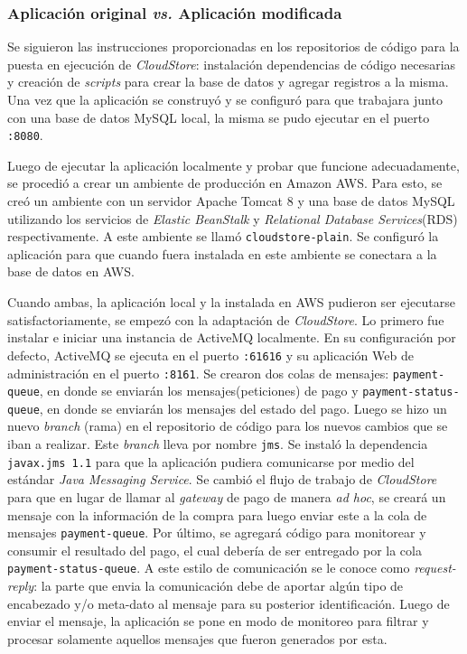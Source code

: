 \documentclass[article]{IEEEtran}
\begin{document}
\subsubsection{Aplicación original \emph{vs.} Aplicación modificada}
Se siguieron las instrucciones proporcionadas en los repositorios de código para la puesta en ejecución de \emph{CloudStore}: instalación dependencias de código necesarias y creación de \emph{scripts} para crear la base de datos y agregar registros a la misma. Una vez que la aplicación se construyó y se configuró para que trabajara junto con una base de datos MySQL local, la misma se pudo ejecutar en el puerto \texttt{:8080}.

Luego de ejecutar la aplicación localmente y probar que funcione adecuadamente, se procedió a crear un ambiente de producción en Amazon AWS. Para esto, se creó un ambiente con un servidor Apache Tomcat 8 y una base de datos MySQL utilizando los servicios de \emph{Elastic BeanStalk} y \emph{Relational Database Services}(RDS) respectivamente. A este ambiente se llamó \texttt{cloudstore-plain}. Se configuró la aplicación para que cuando fuera instalada en este ambiente se conectara a la base de datos en AWS.

Cuando ambas, la aplicación local y la instalada en AWS pudieron ser ejecutarse satisfactoriamente, se empezó con la adaptación de \emph{CloudStore}. Lo primero fue instalar e iniciar una instancia de ActiveMQ localmente. En su configuración por defecto, ActiveMQ se ejecuta en el puerto \texttt{:61616} y su aplicación Web de administración en el puerto \texttt{:8161}. Se crearon dos colas de mensajes: \texttt{payment-queue}, en donde se enviarán los mensajes(peticiones) de pago y \texttt{payment-status-queue}, en donde se enviarán los mensajes del estado del pago.  Luego se hizo un nuevo \emph{branch} (rama) en el repositorio de código para los nuevos cambios que se iban a realizar. Este \emph{branch} lleva por nombre \texttt{jms}. Se instaló la dependencia \texttt{javax.jms 1.1} para que la aplicación pudiera comunicarse por medio del estándar \emph{Java Messaging Service}. Se cambió el flujo de trabajo de \emph{CloudStore} para que en lugar de llamar al \emph{gateway} de pago de manera \emph{ad hoc}, se creará un mensaje con la información de la compra para luego enviar este a la cola de mensajes \texttt{payment-queue}. Por último, se agregará código para monitorear y consumir el resultado del pago, el cual debería de ser entregado por la cola \texttt{payment-status-queue}. A este estilo de comunicación se le conoce como \emph{request-reply}: la parte que envia la comunicación debe de aportar algún tipo de encabezado y/o meta-dato al mensaje para su posterior identificación. Luego de enviar el mensaje, la aplicación se pone en modo de monitoreo para filtrar y procesar solamente aquellos mensajes que fueron generados por esta.
\end{document}
